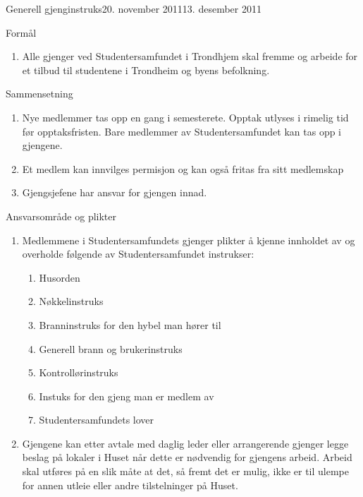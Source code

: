 \documentclass[../fsbok.tex]{subfiles}
\begin{document}
\begin{instruks}{Generell gjenginstruks}{20. november 2011}{13. desember 2011}
    
    \begin{instruksledd}{Formål}
        \begin{enumerate}
            \item Alle gjenger ved Studentersamfundet i Trondhjem skal fremme og arbeide for et
                  tilbud til studentene i Trondheim og byens befolkning.
        \end{enumerate}
    \end{instruksledd}


    \begin{instruksledd}{Sammensetning}
        \begin{enumerate}
            \item Nye medlemmer tas opp en gang i semesterete. Opptak utlyses i rimelig
                tid før opptaksfristen. Bare medlemmer av Studentersamfundet kan tas opp i
                gjengene.
            \item Et medlem kan innvilges permisjon og kan også fritas fra sitt medlemskap
            \item Gjengsjefene har ansvar for gjengen innad.
        \end{enumerate}

    \end{instruksledd}


    \begin{instruksledd}{Ansvarsområde og plikter}
        \begin{enumerate}
            \item Medlemmene i Studentersamfundets gjenger plikter å kjenne innholdet av
                og overholde følgende av Studentersamfundet instrukser:
                \begin{enumerate}
                    \item Husorden
                    \item Nøkkelinstruks
                    \item Branninstruks for den hybel man hører til
                    \item Generell brann og brukerinstruks
                    \item Kontrollørinstruks
                    \item Instuks for den gjeng man er medlem av
                    \item Studentersamfundets lover
                \end{enumerate}
            \item Gjengene kan etter avtale med daglig leder eller arrangerende gjenger
                legge beslag på lokaler i Huset når dette er nødvendig for gjengens
                arbeid. Arbeid skal utføres på en slik måte at det, så fremt det er mulig,
                ikke er til ulempe for annen utleie eller andre tilstelninger på Huset.
        \end{enumerate}


\end{instruksledd}
\end{instruks}
\end{document}
